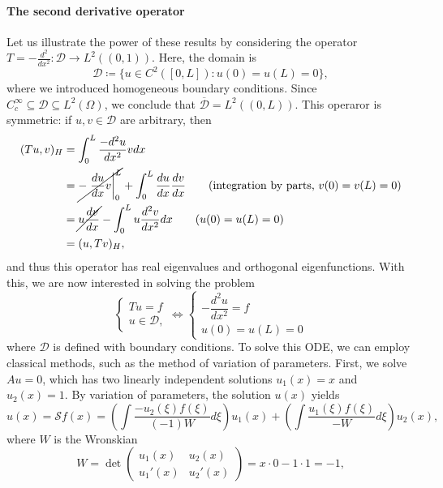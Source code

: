 \paragraph{The second derivative operator} Let us illustrate the power of these results by considering the operator $T=-\frac{d^2}{dx^2}:\mathcal{D}\to L^2((0,1))$. Here, the domain is 
\begin{equation*}
    \mathcal{D} \coloneqq \{u\in C^2([0,L]): u(0)=u(L)=0\},
\end{equation*}
where we introduced homogeneous boundary conditions. Since $C_c^\infty \subseteq \mathcal{D}\subseteq L^2(\Omega)$, we conclude that $\overline{\mathcal{D}} = L^2((0,L))$. This operaror is symmetric: if $u,v\in\mathcal{D}$ are arbitrary, then 
\begin{align*}
    (Tu, v)_H &= \int_0^L \frac{-d^2u}{dx^2}v dx\\
    &= \cancel{-\left.\frac{du}{dx}v\right|_0^L} + \int_0^L \frac{du}{dx}\frac{dv}{dx} \tag{integration by parts, $v(0)=v(L)=0$}\\
    &= \cancel{u\frac{dv}{dx}} - \int_0^L u\frac{d^2 v}{dx^2} dx \tag{$u(0)=u(L)=0$}\\
    &= (u, Tv)_H,
\end{align*}
and thus this operator has real eigenvalues and orthogonal eigenfunctions. With this, we are now interested in solving the problem 
\begin{equation*}
    \begin{cases}
        Tu = f\\
        u\in\mathcal{D},
    \end{cases} \iff 
    \begin{cases}
        -\dfrac{d^2u}{dx^2} = f\\
        u(0)=u(L)=0
    \end{cases}
\end{equation*} 
where $\mathcal{D}$ is defined with boundary conditions. To solve this ODE, we can employ classical methods, such as the method of variation of parameters. First, we solve $Au=0$, which has two linearly independent solutions $u_1(x)=x$ and $u_2(x)=1$. By variation of parameters, the solution $u(x)$ yields
\begin{equation*}
    u(x) = \mathcal{S}f(x) = \left(\int \frac{-u_2(\xi)f(\xi)}{(-1)W}d\xi\right)u_1(x) + \left(\int \frac{u_1(\xi)f(\xi)}{-W}d\xi\right)u_2(x),
\end{equation*}
where $W$ is the Wronskian
\begin{equation*}
    W = \det\left(\begin{matrix}
        u_1(x) & u_2(x)\\
        u_1'(x) & u_2'(x)
    \end{matrix}\right) = x\cdot 0 - 1\cdot 1 = -1,
\end{equation*}

